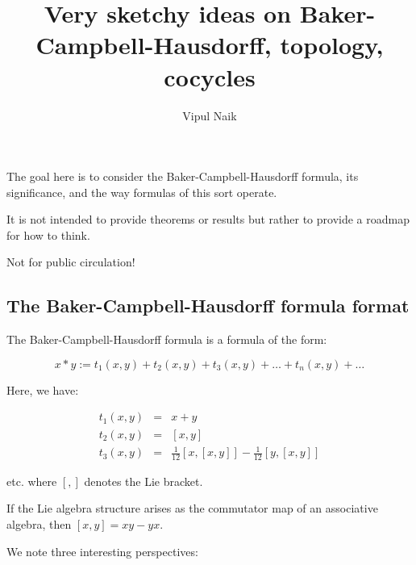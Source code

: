 \documentclass[10pt]{amsart}
\title{Very sketchy ideas on Baker-Campbell-Hausdorff, topology, cocycles}
\author{Vipul Naik}
\begin{document}
\maketitle

The goal here is to consider the Baker-Campbell-Hausdorff formula, its
significance, and the way formulas of this sort operate.

It is not intended to provide theorems or results but rather to provide a roadmap for how to think.

Not for public circulation!

\subsection*{The Baker-Campbell-Hausdorff formula format}

The Baker-Campbell-Hausdorff formula is a formula of the form:

$$x * y := t_1(x,y) + t_2(x,y) + t_3(x,y) + \dots + t_n(x,y) + \dots$$

Here, we have:

\begin{eqnarray*}
  t_1(x,y) & = & x + y \\
  t_2(x,y) & = & [x,y] \\
  t_3(x,y) & = & \frac{1}{12}[x,[x,y]] - \frac{1}{12}[y,[x,y]]
\end{eqnarray*}

etc. where $[ , ]$ denotes the Lie bracket.

If the Lie algebra structure arises as the commutator map of an
associative algebra, then $[x,y] = xy - yx$.

We note three interesting perspectives:
\end{document}
